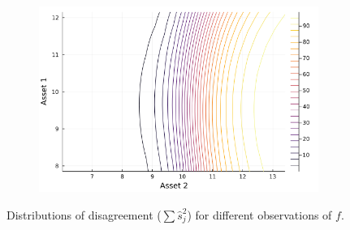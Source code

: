 \documentclass{article}
\begin{document}
\begin{figure}
\begin{subfigure}{0.4\textwidth}
    \end{subfigure}
    \begin{subfigure}{0.4\textwidth}
        \includegraphics[width=\textwidth]{../plots/params/more-corr-meanvarshift/disagreement.png}
    \end{subfigure}
    \caption{Distributions of disagreement ($\sum \hat s_j^2$) for different observations of $f$.}
    \label{fig:disagreement}
\end{figure}
\end{document}
